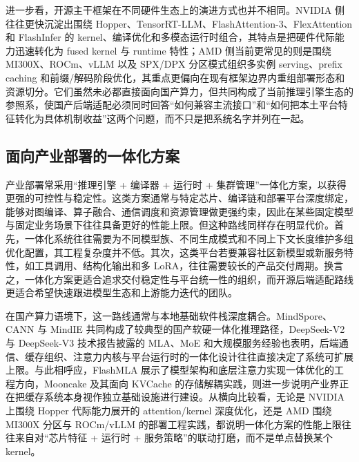 进一步看，开源主干框架在不同硬件生态上的演进方式也并不相同。NVIDIA 侧往往更快沉淀出围绕 Hopper、TensorRT-LLM、FlashAttention-3、FlexAttention 和 FlashInfer 的 kernel、编译优化和多模态运行时组合，其特点是把硬件代际能力迅速转化为 fused kernel 与 runtime 特性；AMD 侧当前更常见的则是围绕 MI300X、ROCm、vLLM 以及 SPX/DPX 分区模式组织多实例 serving、prefix caching 和前缀/解码阶段优化，其重点更偏向在现有框架边界内重组部署形态和资源切分\citep{tensorrtllm,flashinfer,shah2024flashattention3,dong2025flexattention,zhang2024vllmamd,song2026amdgpupartition,ambati2025mi300x}。它们虽然未必都直接面向国产算力，但共同构成了当前推理引擎生态的参照系，使国产后端适配必须同时回答“如何兼容主流接口”和“如何把本土平台特征转化为具体机制收益”这两个问题，而不只是把系统名字并列在一起。

\subsection{面向产业部署的一体化方案}

产业部署常采用“推理引擎 + 编译器 + 运行时 + 集群管理”一体化方案，以获得更强的可控性与稳定性。这类方案通常与特定芯片、编译链和部署平台深度绑定，能够对图编译、算子融合、通信调度和资源管理做更强约束，因此在某些固定模型与固定业务场景下往往具备更好的性能上限。但这种路线同样存在明显代价。首先，一体化系统往往需要为不同模型族、不同生成模式和不同上下文长度维护多组优化配置，其工程复杂度并不低。其次，这类平台若要兼容社区新模型或新服务特性，如工具调用、结构化输出和多 LoRA，往往需要较长的产品交付周期。换言之，一体化方案更适合追求交付稳定性与平台统一性的组织，而开源后端适配路线更适合希望快速跟进模型生态和上游能力迭代的团队。

在国产算力语境下，这一路线通常与本地基础软件栈深度耦合。MindSpore、CANN 与 MindIE 共同构成了较典型的国产软硬一体化推理路径，DeepSeek-V2 与 DeepSeek-V3 技术报告披露的 MLA、MoE 和大规模服务经验也表明，后端通信、缓存组织、注意力内核与平台运行时的一体化设计往往直接决定了系统可扩展上限\citep{mindspore,ascendcann,mindie,liu2024deepseekv2,deepseekv3}。与此相呼应，FlashMLA 展示了模型架构和底层注意力实现一体优化的工程方向，Mooncake 及其面向 KVCache 的存储解耦实践，则进一步说明产业界正在把缓存系统本身视作独立基础设施进行建设\citep{deepseekflashmla,qin2024mooncake,miao2024mooncake}。从横向比较看，无论是 NVIDIA 上围绕 Hopper 代际能力展开的 attention/kernel 深度优化，还是 AMD 围绕 MI300X 分区与 ROCm/vLLM 的部署工程实践，都说明一体化方案的性能上限往往来自对“芯片特征 + 运行时 + 服务策略”的联动打磨，而不是单点替换某个 kernel\citep{shah2024flashattention3,zhang2024vllmamd,song2026amdgpupartition,ambati2025mi300x}。


